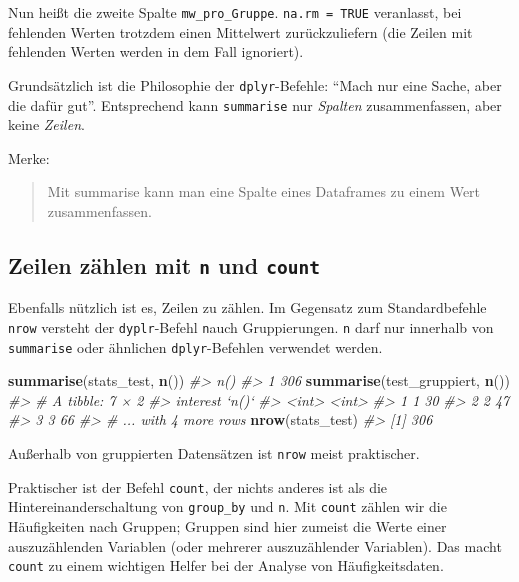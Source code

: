 \documentclass[12pt,]{book}
\makeatletter
\newenvironment{Shaded}{\begin{snugshade}}{\end{snugshade}}
\newcommand{\KeywordTok}[1]{\textcolor[rgb]{0.13,0.29,0.53}{\textbf{{#1}}}}
\newcommand{\CommentTok}[1]{\textcolor[rgb]{0.56,0.35,0.01}{\textit{{#1}}}}
\newcommand{\NormalTok}[1]{{#1}}
\newenvironment{kframe}{%
\medskip{}
\setlength{\fboxsep}{.8em}
 \def\at@end@of@kframe{}%
 \ifinner\ifhmode%
  \def\at@end@of@kframe{\end{minipage}}%
  \begin{minipage}{\columnwidth}%
 \fi\fi%
 \def\FrameCommand##1{\hskip\@totalleftmargin \hskip-\fboxsep
 \colorbox{shadecolor}{##1}\hskip-\fboxsep
     \hskip-\linewidth \hskip-\@totalleftmargin \hskip\columnwidth}%
 \MakeFramed {\advance\hsize-\width
   \@totalleftmargin\z@ \linewidth\hsize
   \@setminipage}}%
 {\par\unskip\endMakeFramed%
 \at@end@of@kframe}
\renewenvironment{Shaded}{\begin{kframe}}{\end{kframe}}
\makeatother
\begin{document}
Nun heißt die zweite Spalte \texttt{mw\_pro\_Gruppe}.
\texttt{na.rm\ =\ TRUE} veranlasst, bei fehlenden Werten trotzdem einen
Mittelwert zurückzuliefern (die Zeilen mit fehlenden Werten werden in
dem Fall ignoriert).

Grundsätzlich ist die Philosophie der \texttt{dplyr}-Befehle: ``Mach nur
eine Sache, aber die dafür gut''. Entsprechend kann \texttt{summarise}
nur \emph{Spalten} zusammenfassen, aber keine \emph{Zeilen}.

Merke:

\begin{quote}
Mit summarise kann man eine Spalte eines Dataframes zu einem Wert
zusammenfassen.
\end{quote}

\subsection{\texorpdfstring{Zeilen zählen mit \texttt{n} und
\texttt{count}}{Zeilen zählen mit n und count}}\label{zeilen-zahlen-mit-n-und-count}

Ebenfalls nützlich ist es, Zeilen zu zählen. Im Gegensatz zum
Standardbefehle \texttt{nrow} versteht der \texttt{dyplr}-Befehl
\texttt{n}auch Gruppierungen. \texttt{n} darf nur innerhalb von
\texttt{summarise} oder ähnlichen \texttt{dplyr}-Befehlen verwendet
werden.

\begin{Shaded}
\begin{Highlighting}[]
\KeywordTok{summarise}\NormalTok{(stats_test, }\KeywordTok{n}\NormalTok{())}
\CommentTok{#>   n()}
\CommentTok{#> 1 306}
\KeywordTok{summarise}\NormalTok{(test_gruppiert, }\KeywordTok{n}\NormalTok{())}
\CommentTok{#> # A tibble: 7 × 2}
\CommentTok{#>   interest `n()`}
\CommentTok{#>      <int> <int>}
\CommentTok{#> 1        1    30}
\CommentTok{#> 2        2    47}
\CommentTok{#> 3        3    66}
\CommentTok{#> # ... with 4 more rows}
\KeywordTok{nrow}\NormalTok{(stats_test)}
\CommentTok{#> [1] 306}
\end{Highlighting}
\end{Shaded}

Außerhalb von gruppierten Datensätzen ist \texttt{nrow} meist
praktischer.

Praktischer ist der Befehl \texttt{count}, der nichts anderes ist als
die Hintereinanderschaltung von \texttt{group\_by} und \texttt{n}. Mit
\texttt{count} zählen wir die Häufigkeiten nach Gruppen; Gruppen sind
hier zumeist die Werte einer auszuzählenden Variablen (oder mehrerer
auszuzählender Variablen). Das macht \texttt{count} zu einem wichtigen
Helfer bei der Analyse von Häufigkeitsdaten.
\end{document}
